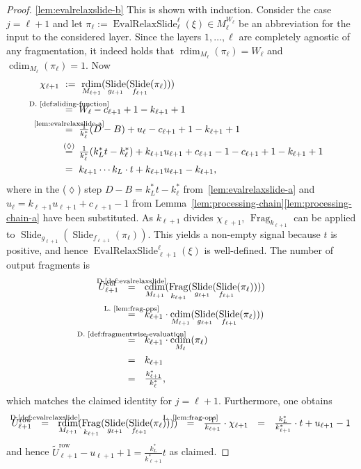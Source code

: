 \documentclass[journal]{IEEEtran}
\newcommand{\ROI}{B}
\DeclareMathOperator{\rdim}{rdim}
\DeclareMathOperator{\cdim}{cdim}
\DeclareMathOperator{\Slide}{Slide}
\DeclareMathOperator{\Fragmentation}{Frag}
\newcommand{\row}{\operatorname{row}}
\newcommand{\col}{\operatorname{col}}
\newcommand{\equsing}[1]{\overset{\mathclap{\text{#1}}}{=}}
\DeclareMathOperator{\EvalRelaxSlide}{EvalRelaxSlide}
\begin{document}
\begin{proof}
\ref{lem:evalrelaxslide-b}
This is shown with induction.
Consider the case $j = \ell + 1$ and let $\pi_\ell := \EvalRelaxSlide_\ell^\ell(\xi)\in M_\ell^{W_\ell}$ be an abbreviation for the input to the considered layer.
Since the layers $1,\dotsc,\ell$ are completely agnostic of any fragmentation, it indeed holds that $\rdim_{M_\ell}(\pi_\ell) = W_\ell$ and $\cdim_{M_\ell}(\pi_\ell) = 1$.
Now
\begin{align*}
  \chi_{\ell + 1}\ &:=\ \rdim_{M_{\ell + 1}}(\Slide_{g_{\ell + 1}}(\Slide_{f_{\ell + 1}}(\pi_\ell)))\\
  &\equsing{D.~\ref{def:sliding-function}}\ W_\ell - c_{\ell + 1} + 1 - k_{\ell + 1} + 1\\
  &\equsing{\ref{lem:evalrelaxslide-a}}\ \tfrac{1}{k_\ell^*}(D - \ROI) + u_\ell - c_{\ell + 1} + 1 - k_{\ell + 1} + 1\\
  &\equsing{($\lozenge$)}\ \tfrac{1}{k_\ell^*}(k_L^*t - k_\ell^*) + k_{\ell + 1}u_{\ell + 1} + c_{\ell + 1} - 1 - c_{\ell + 1} + 1 - k_{\ell + 1} + 1\\
  &=\ k_{\ell + 1}\cdots k_L\cdot t + k_{\ell + 1}u_{\ell + 1} - k_{\ell + 1}\text{,}
\end{align*}
where in the ($\lozenge$) step $D - \ROI = k_L^*t - k_\ell^*$ from~\ref{lem:evalrelaxslide-a} and $u_{\ell} = k_{\ell + 1}u_{\ell + 1} + c_{\ell + 1} - 1$ from Lemma~\ref{lem:processing-chain}\ref{lem:processing-chain-a} have been substituted.
As $k_{\ell + 1}$ divides $\chi_{\ell + 1}$, $\Fragmentation_{k_{\ell + 1}}$ can be applied to $\Slide_{g_{\ell + 1}}(\Slide_{f_{\ell + 1}}(\pi_\ell))$.
This yields a non-empty signal because $t$ is positive, and hence $\EvalRelaxSlide_{\ell + 1}^\ell(\xi)$ is well-defined.
The number of output fragments is
\begin{align*}
  \tilde{U}_{\ell + 1}^{\col}\ \ &\equsing{D.\ref{def:evalrelaxslide}}\ \ \cdim_{M_{\ell + 1}}(\Fragmentation_{k_{\ell + 1}}(\Slide_{g_{\ell + 1}}(\Slide_{f_{\ell + 1}}(\pi_\ell))))\\
  &\equsing{L.~\ref{lem:frag-ops}}\ \ k_{\ell + 1}\cdot \cdim_{M_{\ell + 1}}(\Slide_{g_{\ell + 1}}(\Slide_{f_{\ell + 1}}(\pi_\ell)))\\
  &\equsing{D.~\ref{def:fragmentwise-evaluation}}\ \ k_{\ell + 1}\cdot \cdim_{M_\ell}(\pi_\ell)\\
  &=\ \ k_{\ell + 1}\\
  &=\ \ \tfrac{k_{\ell + 1}^*}{k_\ell^*}\text{,}
\end{align*}
which matches the claimed identity for $j = \ell + 1$.
Furthermore, one obtains
\begin{displaymath}
  \tilde{U}_{\ell + 1}^{\row}
  \ \ \equsing{D.\ref{def:evalrelaxslide}}\ \ \rdim_{M_{\ell + 1}}(\Fragmentation_{k_{\ell + 1}}(\Slide_{g_{\ell + 1}}(\Slide_{f_{\ell + 1}}(\pi_\ell))))
  \ \ \equsing{L.~\ref{lem:frag-ops}}\ \ \tfrac{1}{k_{\ell + 1}}\cdot\chi_{\ell + 1}
  \ \ =\ \ \tfrac{k_L^*}{k_{\ell + 1}^*}\cdot t + u_{\ell + 1} - 1
\end{displaymath}
and hence $\tilde{U}_{\ell + 1}^{\row} - u_{\ell + 1} + 1 = \frac{k_L^*}{k_{\ell + 1}^*}t$ as claimed.


\end{proof}
\end{document}
